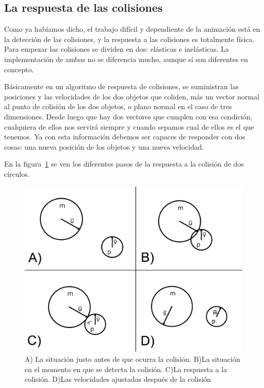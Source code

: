\subsection{La respuesta de las colisiones}

Como ya habíamos dicho, el trabajo difícil y dependiente de la animación está en la detección de las colisiones, y la respuesta a las colisiones es totalmente física. Para empezar las colisiones se dividen en dos: elásticas e inelásticas. La implementación de ambas no se diferencia mucho, aunque sí son diferentes en concepto.

Básicamente en un algoritmo de respuesta de colisiones, se suministran las posiciones y las velocidades de los dos objetos que coliden, más un vector normal al punto de colisión de los dos objetos, o plano normal en el caso de tres dimensiones. Desde luego que hay dos vectores que cumplen con esa condición, cualquiera de ellos nos servirá siempre y cuando sepamos cual de ellos es el que tenemos. Ya con esta información debemos ser capaces de responder con dos cosas: una nueva posición de los objetos y una nueva velocidad.

En la figura~\ref{colision:fig} se ven los diferentes pasos de la respuesta a la colisión de dos círculos.
\begin{figure}
 \centering
 \includegraphics[]{Img/colisiones}
 \caption[Colisión elástica]{A) La situación justo antes de que ocurra la colisión. B)La situación en el momento en que se detecta la colisión. C)La respuesta a la colisión. D)Las velocidades ajustadas después de la colisión} 
 \label{colision:fig}
\end{figure}

